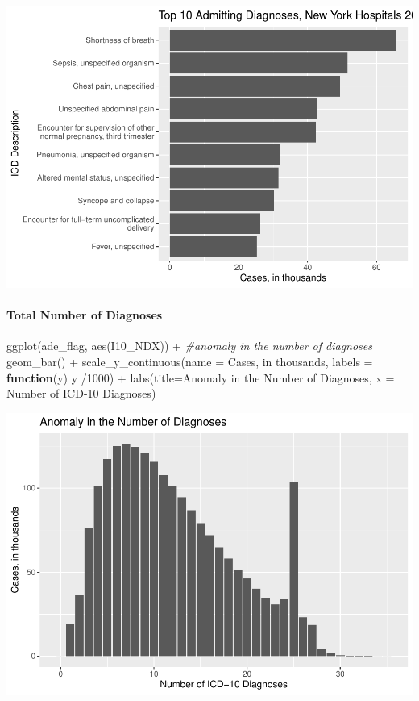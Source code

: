 \documentclass[preprint, 3p,
authoryear]{elsarticle} %
\newenvironment{Shaded}{\begin{snugshade}}{\end{snugshade}}
\newcommand{\AttributeTok}[1]{\textcolor[rgb]{0.77,0.63,0.00}{#1}}
\newcommand{\CommentTok}[1]{\textcolor[rgb]{0.56,0.35,0.01}{\textit{#1}}}
\newcommand{\ControlFlowTok}[1]{\textcolor[rgb]{0.13,0.29,0.53}{\textbf{#1}}}
\newcommand{\DecValTok}[1]{\textcolor[rgb]{0.00,0.00,0.81}{#1}}
\newcommand{\FunctionTok}[1]{\textcolor[rgb]{0.00,0.00,0.00}{#1}}
\newcommand{\NormalTok}[1]{#1}
\newcommand{\SpecialCharTok}[1]{\textcolor[rgb]{0.00,0.00,0.00}{#1}}
\newcommand{\StringTok}[1]{\textcolor[rgb]{0.31,0.60,0.02}{#1}}
\begin{document}
\includegraphics{final-project-paper_files/figure-latex/dx-admitting-1.pdf}

\hypertarget{total-number-of-diagnoses}{%
\paragraph{Total Number of Diagnoses}\label{total-number-of-diagnoses}}

\begin{Shaded}
\begin{Highlighting}[]
\FunctionTok{ggplot}\NormalTok{(ade\_flag, }\FunctionTok{aes}\NormalTok{(I10\_NDX)) }\SpecialCharTok{+} \CommentTok{\#anomaly in the number of diagnoses}
  \FunctionTok{geom\_bar}\NormalTok{() }\SpecialCharTok{+}
    \FunctionTok{scale\_y\_continuous}\NormalTok{(}\AttributeTok{name =} \StringTok{\textquotesingle{}Cases, in thousands\textquotesingle{}}\NormalTok{, }\AttributeTok{labels =} \ControlFlowTok{function}\NormalTok{(y) y }\SpecialCharTok{/}\DecValTok{1000}\NormalTok{) }\SpecialCharTok{+}
  \FunctionTok{labs}\NormalTok{(}\AttributeTok{title=}\StringTok{\textquotesingle{}Anomaly in the Number of Diagnoses\textquotesingle{}}\NormalTok{, }\AttributeTok{x =} \StringTok{\textquotesingle{}Number of ICD{-}10 Diagnoses\textquotesingle{}}\NormalTok{)}
\end{Highlighting}
\end{Shaded}

\includegraphics{final-project-paper_files/figure-latex/n-dx-plot-1.pdf}
\end{document}
